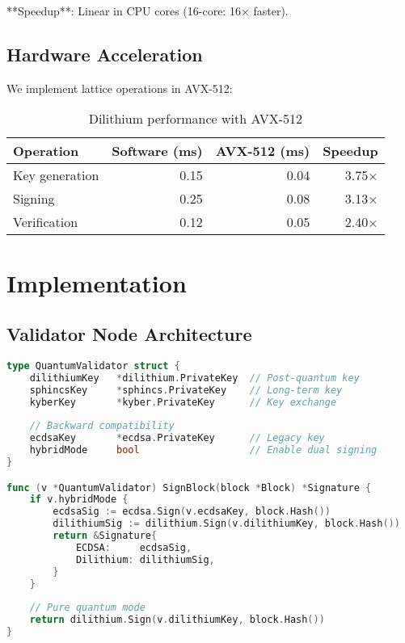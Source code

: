 \documentclass[11pt,letterpaper]{article}
\begin{document}
**Speedup**: Linear in CPU cores (16-core: 16× faster).

\subsection{Hardware Acceleration}

We implement lattice operations in AVX-512:

\begin{table}[h]
\centering
\begin{tabular}{lrrr}
\toprule
\textbf{Operation} & \textbf{Software (ms)} & \textbf{AVX-512 (ms)} & \textbf{Speedup} \\
\midrule
Key generation & 0.15 & 0.04 & 3.75× \\
Signing & 0.25 & 0.08 & 3.13× \\
Verification & 0.12 & 0.05 & 2.40× \\
\bottomrule
\end{tabular}
\caption{Dilithium performance with AVX-512}
\end{table}

\section{Implementation}

\subsection{Validator Node Architecture}

\begin{lstlisting}[language=Go]
type QuantumValidator struct {
    dilithiumKey   *dilithium.PrivateKey  // Post-quantum key
    sphincsKey     *sphincs.PrivateKey    // Long-term key
    kyberKey       *kyber.PrivateKey      // Key exchange
    
    // Backward compatibility
    ecdsaKey       *ecdsa.PrivateKey      // Legacy key
    hybridMode     bool                   // Enable dual signing
}

func (v *QuantumValidator) SignBlock(block *Block) *Signature {
    if v.hybridMode {
        ecdsaSig := ecdsa.Sign(v.ecdsaKey, block.Hash())
        dilithiumSig := dilithium.Sign(v.dilithiumKey, block.Hash())
        return &Signature{
            ECDSA:     ecdsaSig,
            Dilithium: dilithiumSig,
        }
    }
    
    // Pure quantum mode
    return dilithium.Sign(v.dilithiumKey, block.Hash())
}
\end{lstlisting}
\end{document}
